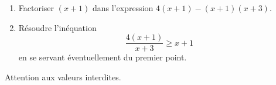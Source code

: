 
\begin{exercice}\label{exosmath-0353}

    \begin{enumerate}
        \item
            Factoriser \( (x+1)\) dans l'expression \( 4(x+1)-(x+1)(x+3)\).
        \item
Résoudre l'inéquation
\begin{equation}
    \frac{ 4(x+1) }{ x+3 }\geq x+1
\end{equation}
en se servant éventuellement du premier point.
    \end{enumerate}
Attention aux valeurs interdites.

\end{exercice}
